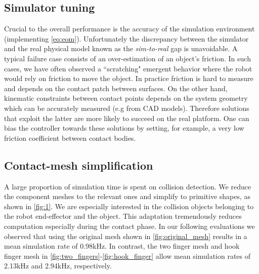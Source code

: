 \subsection{Simulator tuning}
Crucial to the overall performance is the accuracy of the simulation environment (implementing \eqref{eq:eom}). Unfortunately the discrepancy between the simulator and the real physical model known as the \emph{sim-to-real} gap is unavoidable. A typical failure case consists of an over-estimation of an object's friction. In such cases, we have often observed a ``scratching" emergent behavior where the robot would rely on friction to move the object. In practice friction is hard to measure and depends on the contact patch between surfaces. On the other hand, kinematic constraints between contact points depends on the system geometry which can be accurately measured (e.g from CAD models). Therefore solutions that exploit the latter are more likely to succeed on the real platform. One can bias the controller towards these solutions by setting, for example, a very low friction coefficient between contact bodies.

\subsection{Contact-mesh simplification}
A large proportion of simulation time is spent on collision detection. We reduce the component meshes to the relevant ones and simplify to primitive shapes, as shown in \fig\ref{fig:1}. We are especially interested in the collision objects belonging to the robot end-effector and the object. This adaptation tremendously reduces computation especially during the contact phase. In our following evaluations we observed that using the original mesh shown in \fig\ref{fig:original_mesh} results in a mean simulation rate of 0.98kHz. In contrast, the two finger mesh and hook finger mesh in \fig\ref{fig:two_fingers}-\ref{fig:hook_finger} allow mean simulation rates of 2.13kHz and 2.94kHz, respectively.

